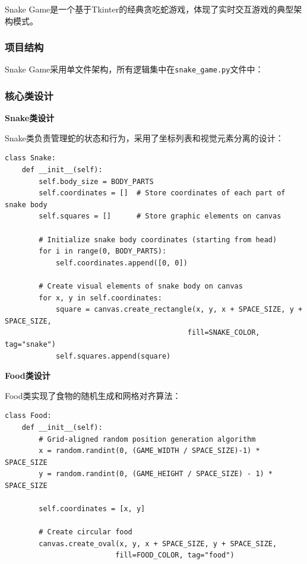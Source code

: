 \documentclass[a4paper]{article}
\begin{document}
Snake Game是一个基于Tkinter的经典贪吃蛇游戏，体现了实时交互游戏的典型架构模式。

\subsubsection{项目结构}

Snake Game采用单文件架构，所有逻辑集中在\texttt{snake\_game.py}文件中：


\subsubsection{核心类设计}

\textbf{Snake类设计}

Snake类负责管理蛇的状态和行为，采用了坐标列表和视觉元素分离的设计：

\begin{lstlisting}[style=pythoncode, caption=Snake类核心代码]
class Snake:
    def __init__(self):
        self.body_size = BODY_PARTS
        self.coordinates = []  # Store coordinates of each part of snake body
        self.squares = []      # Store graphic elements on canvas
        
        # Initialize snake body coordinates (starting from head)
        for i in range(0, BODY_PARTS):
            self.coordinates.append([0, 0])
        
        # Create visual elements of snake body on canvas
        for x, y in self.coordinates:
            square = canvas.create_rectangle(x, y, x + SPACE_SIZE, y + SPACE_SIZE, 
                                           fill=SNAKE_COLOR, tag="snake")
            self.squares.append(square)
\end{lstlisting}

\textbf{Food类设计}

Food类实现了食物的随机生成和网格对齐算法：

\begin{lstlisting}[style=pythoncode, caption=Food类核心代码]
class Food:
    def __init__(self):
        # Grid-aligned random position generation algorithm
        x = random.randint(0, (GAME_WIDTH / SPACE_SIZE)-1) * SPACE_SIZE
        y = random.randint(0, (GAME_HEIGHT / SPACE_SIZE) - 1) * SPACE_SIZE
        
        self.coordinates = [x, y]
        
        # Create circular food
        canvas.create_oval(x, y, x + SPACE_SIZE, y + SPACE_SIZE, 
                          fill=FOOD_COLOR, tag="food")
\end{lstlisting}
\end{document}
